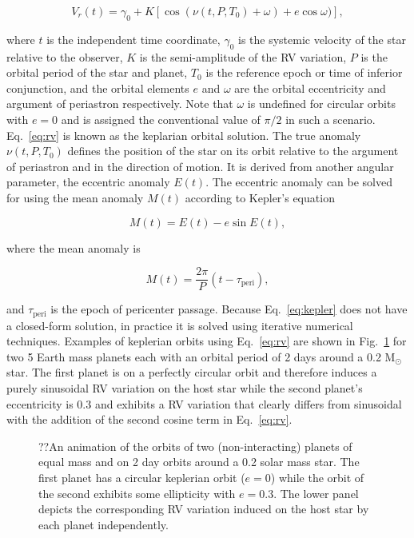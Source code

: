 \begin{equation}
V_r(t) = \gamma_0 + K[\cos{(\nu(t,P,T_0) + \omega)} + e\cos{\omega})],
\label{eq:rv}
\end{equation}

\noindent where $t$ is the independent time coordinate, $\gamma_0$ is the systemic velocity of
the star relative to the observer, $K$ is the semi-amplitude of the RV variation,
$P$ is the orbital period of the star and planet, 
$T_0$ is the reference epoch or time of inferior conjunction, and
the orbital elements $e$ and $\omega$ are the orbital eccentricity and argument of
periastron respectively. Note that $\omega$ is undefined for circular orbits with
$e=0$ and is assigned the conventional value of $\pi/2$ in such a scenario.
Eq.~\ref{eq:rv} is known as the keplarian orbital solution.
The true anomaly $\nu(t,P,T_0)$ defines the position of the star on its orbit 
relative to the argument of periastron and in the direction of motion. It is derived 
from another angular parameter, the eccentric anomaly $E(t)$. The eccentric 
anomaly can be solved for using the mean anomaly $M(t)$ according to 
Kepler's equation

\begin{equation}
M(t) = E(t)-e\sin{E(t)},
\label{eq:kepler} 
\end{equation}

\noindent where the mean anomaly is

\begin{equation}
M(t) = \frac{2\pi}{P} (t-\tau_{\mathrm{peri}}), 
\end{equation}

\noindent and $\tau_{\mathrm{peri}}$ is the epoch of 
pericenter passage. Because Eq.~\ref{eq:kepler} does not have a closed-form 
solution, in practice it is solved using iterative numerical techniques. 
Examples of keplerian orbits using Eq.~\ref{eq:rv} are shown in Fig.~\ref{fig:rv} 
for two 5 Earth mass planets each with an orbital period of 2 days around a 0.2 M$_{\odot}$ 
star. The first planet is on a perfectly circular orbit and therefore induces a purely
sinusoidal RV variation on the host star while the second planet's eccentricity is 0.3 and
exhibits a RV variation that clearly differs from sinusoidal with the addition of the second
cosine term in Eq.~\ref{eq:rv}. \\

\begin{figure}
  \centering
  \caption[Animation of observed radial velocities for different orbital configurations.]
      {??An animation of the orbits of two (non-interacting) planets of equal
    mass and on 2 day orbits around a 0.2 solar mass star. The first planet has a circular
    keplerian orbit ($e=0$) while the orbit of the second exhibits some ellipticity with
    $e=0.3$. The lower panel depicts the corresponding RV variation induced on the host star
    by each planet independently.}
  \label{fig:rv}
\end{figure}

